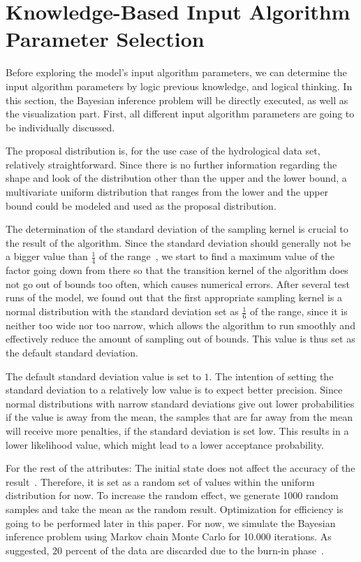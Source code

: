\section{Knowledge-Based Input Algorithm Parameter Selection}

Before exploring the model's input algorithm parameters, we can determine the input algorithm parameters by logic previous knowledge, and logical thinking. In this section, the Bayesian inference problem will be directly executed, as well as the visualization part. First, all different input algorithm parameters are going to be individually discussed.

The proposal distribution is, for the use case of the hydrological data set, relatively straightforward. Since there is no further information regarding the shape and look of the distribution other than the upper and the lower bound, a multivariate uniform distribution that ranges from the lower and the upper bound could be modeled and used as the proposal distribution.

The determination of the standard deviation of the sampling kernel is crucial to the result of the algorithm. Since the standard deviation should generally not be a bigger value than $\frac 1 4$ of the range~\cite{good_standard_deviation}, we start to find a maximum value of the factor going down from there so that the transition kernel of the algorithm does not go out of bounds too often, which causes numerical errors. After several test runs of the model, we found out that the first appropriate sampling kernel is a normal distribution with the standard deviation set as $\frac 1 6$ of the range, since it is neither too wide nor too narrow, which allows the algorithm to run smoothly and effectively reduce the amount of sampling out of bounds. This value is thus set as the default standard deviation.

The default standard deviation value is set to $1$. The intention of setting the standard deviation to a relatively low value is to expect better precision. Since normal distributions with narrow standard deviations give out lower probabilities if the value is away from the mean, the samples that are far away from the mean will receive more penalties, if the standard deviation is set low. This results in a lower likelihood value, which might lead to a lower acceptance probability.

For the rest of the attributes: The initial state does not affect the accuracy of the result~\cite{mcmc_practice}. Therefore, it is set as a random set of values within the uniform distribution for now. To increase the random effect, we generate 1000 random samples and take the mean as the random result. Optimization for efficiency is going to be performed later in this paper. For now, we simulate the Bayesian inference problem using Markov chain Monte Carlo for 10.000 iterations. As suggested, $20$ percent of the data are discarded due to the burn-in phase~\cite{20per_burnin}.



